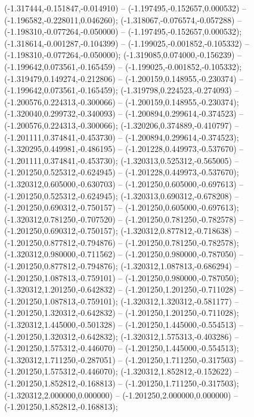  (-1.317444,-0.151847,-0.014910) -- (-1.197495,-0.152657,0.000532) -- (-1.196582,-0.228011,0.046260);
 (-1.318067,-0.076574,-0.057288) -- (-1.198310,-0.077264,-0.050000) -- (-1.197495,-0.152657,0.000532);
 (-1.318614,-0.001287,-0.104399) -- (-1.199025,-0.001852,-0.105332) -- (-1.198310,-0.077264,-0.050000);
 (-1.319085,0.074000,-0.156239) -- (-1.199642,0.073561,-0.165459) -- (-1.199025,-0.001852,-0.105332);
 (-1.319479,0.149274,-0.212806) -- (-1.200159,0.148955,-0.230374) -- (-1.199642,0.073561,-0.165459);
 (-1.319798,0.224523,-0.274093) -- (-1.200576,0.224313,-0.300066) -- (-1.200159,0.148955,-0.230374);
 (-1.320040,0.299732,-0.340093) -- (-1.200894,0.299614,-0.374523) -- (-1.200576,0.224313,-0.300066);
 (-1.320206,0.374889,-0.410797) -- (-1.201111,0.374841,-0.453730) -- (-1.200894,0.299614,-0.374523);
 (-1.320295,0.449981,-0.486195) -- (-1.201228,0.449973,-0.537670) -- (-1.201111,0.374841,-0.453730);
 (-1.320313,0.525312,-0.565005) -- (-1.201250,0.525312,-0.624945) -- (-1.201228,0.449973,-0.537670);
 (-1.320312,0.605000,-0.630703) -- (-1.201250,0.605000,-0.697613) -- (-1.201250,0.525312,-0.624945);
 (-1.320313,0.690312,-0.678208) -- (-1.201250,0.690312,-0.750157) -- (-1.201250,0.605000,-0.697613);
 (-1.320312,0.781250,-0.707520) -- (-1.201250,0.781250,-0.782578) -- (-1.201250,0.690312,-0.750157);
 (-1.320312,0.877812,-0.718638) -- (-1.201250,0.877812,-0.794876) -- (-1.201250,0.781250,-0.782578);
 (-1.320312,0.980000,-0.711562) -- (-1.201250,0.980000,-0.787050) -- (-1.201250,0.877812,-0.794876);
 (-1.320312,1.087813,-0.686294) -- (-1.201250,1.087813,-0.759101) -- (-1.201250,0.980000,-0.787050);
 (-1.320312,1.201250,-0.642832) -- (-1.201250,1.201250,-0.711028) -- (-1.201250,1.087813,-0.759101);
 (-1.320312,1.320312,-0.581177) -- (-1.201250,1.320312,-0.642832) -- (-1.201250,1.201250,-0.711028);
 (-1.320312,1.445000,-0.501328) -- (-1.201250,1.445000,-0.554513) -- (-1.201250,1.320312,-0.642832);
 (-1.320312,1.575313,-0.403286) -- (-1.201250,1.575312,-0.446070) -- (-1.201250,1.445000,-0.554513);
 (-1.320312,1.711250,-0.287051) -- (-1.201250,1.711250,-0.317503) -- (-1.201250,1.575312,-0.446070);
 (-1.320312,1.852812,-0.152622) -- (-1.201250,1.852812,-0.168813) -- (-1.201250,1.711250,-0.317503);
 (-1.320312,2.000000,0.000000) -- (-1.201250,2.000000,0.000000) -- (-1.201250,1.852812,-0.168813);
